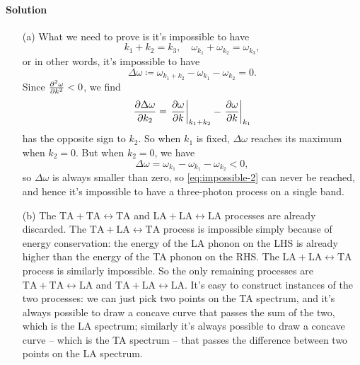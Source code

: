 \documentclass[hyperref, a4paper]{article}
\begin{document}
\paragraph{Solution} \begin{itemize}
\item[(a)] What we need to prove is it's impossible to have 
\begin{equation}
    k_1 + k_2 = k_3, \quad 
    \omega_{k_1} + \omega_{k_2} = \omega_{k_3},
\end{equation}
or in other words, it's impossible to have 
\begin{equation}
    \Delta \omega \coloneqq \omega_{k_1 + k_2} - \omega_{k_1} - \omega_{k_2} = 0.
    \label{eq:impossible-2}
\end{equation}
Since $\pdv[2]{\omega}{k} < 0$, we find  
\[
    \pdv{\Delta \omega}{k_2} = \eval{\pdv{\omega}{k}}_{k_1 + k_2} - \eval{\pdv{\omega}{k}}_{k_1}
\]
has the opposite sign to $k_2$. 
So when $k_1$ is fixed, $\Delta \omega$ reaches its maximum when $k_2 = 0$.
But when $k_2 = 0$, we have 
\[
    \Delta \omega = \omega_{k_1} - \omega_{k_1} - \omega_{k_2} < 0,
\]
so $\Delta \omega$ is always smaller than zero, so \eqref{eq:impossible-2} can never be reached,
and hence it's impossible to have a three-photon process on a single band.

\item[(b)] The $\mathrm{TA} + \mathrm{TA} \leftrightarrow \mathrm{TA}$ 
and $\mathrm{LA} + \mathrm{LA} \leftrightarrow \mathrm{LA}$ 
processes are already discarded.
The $\mathrm{TA} + \mathrm{LA} \leftrightarrow \mathrm{TA}$ process 
is impossible simply because of energy conservation:
the energy of the LA phonon on the LHS is already higher than the energy of the TA phonon on the RHS.
The $\mathrm{LA} + \mathrm{LA} \leftrightarrow \mathrm{TA}$ process 
is similarly impossible.
So the only remaining processes are $\mathrm{TA} + \mathrm{TA} \leftrightarrow \mathrm{LA}$
and $\mathrm{TA} + \mathrm{LA} \leftrightarrow \mathrm{LA}$.
It's easy to construct instances of the two processes:
we can just pick two points on the TA spectrum, 
and it's always possible to draw a concave curve that passes the sum of the two,
which is the LA spectrum;
similarly it's always possible to draw a concave curve -- which is the TA spectrum -- that passes the difference 
between two points on the LA spectrum.

\end{itemize}
\end{document}
